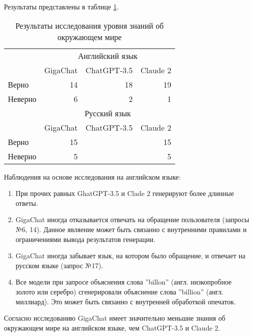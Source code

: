 \documentclass{article}
\begin{document}
Результаты представлены в таблице \ref{tab:common_sense}.


\begin{table}[ht]
    \centering
    \begin{tabular}{lrrr}
        \toprule
                & \multicolumn{3}{c}{Английский язык}                          \\
        \cmidrule(r){2-4}
                & GigaChat                            & ChatGPT-3.5 & Claude 2 \\
        \midrule
        Верно   & 14                                  & 18          & 19       \\
        Неверно & 6                                   & 2           & 1        \\
        \midrule
                & \multicolumn{3}{c}{Русский язык}                             \\
        \cmidrule(r){2-4}
                & GigaChat                            & ChatGPT-3.5 & Claude 2 \\
        \midrule
        Верно   & 15                                  &             & 15       \\
        Неверно & 5                                   &             & 5        \\
        \bottomrule
    \end{tabular}
    \caption{Результаты исследования уровня знаний об окружающем мире}
    \label{tab:common_sense}
\end{table}

Наблюдения на основе исследования на английском языке:
\begin{enumerate}
    \item При прочих равных GhatGPT-3.5 и Clade 2 генерируют более длинные ответы.
    \item GigaChat иногда отказывается отвечать на обращение пользователя (запросы №6, 14). Данное являение может быть связанно с внутренними правилами и ограничениями вывода результатов генерации.
    \item GigaChat иногда забывает язык, на котором было обращение, и отвечает на русском языке (запрос №17).
    \item Все модели при запросе объяснения слова ''billon'' (англ. низкопробное золото или серебро) сгенерировали объяснение слова ''billion'' (англ. миллиард). Это может быть связанно с внутренней обработкой опечаток.
\end{enumerate}

Согласно исследованию GigaChat имеет значительно меньшие знания об окружающем мире на английском языке, чем ChatGPT-3.5 и Claude 2.
\end{document}
